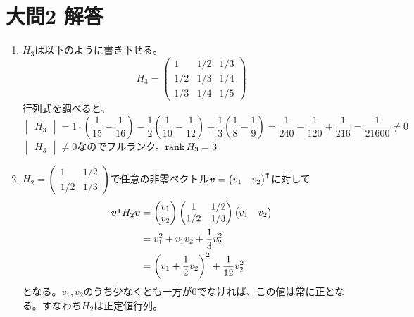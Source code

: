 \documentclass[dvipdfmx]{jsreport}
\begin{document}
\section{大問2 解答}
\begin{souanswer} %
\begin{enumerate}
	\item $H_3$は以下のように書き下せる。
\begin{equation*}
	H_3= 
\begin{pmatrix}
	1& 1/2& 1/3\\
	1/2& 1/3& 1/4\\
	1/3& 1/4& 1/5
\end{pmatrix}
\end{equation*}
	行列式を調べると、
\begin{equation*}
	\begin{vmatrix}H_3\end{vmatrix}= 1\cdot \left(\frac{1}{15}- \frac{1}{16}\right)- \frac{1}{2}\left(\frac{1}{10}- \frac{1}{12}\right)+ \frac{1}{3}\left(\frac{1}{8}- \frac{1}{9}\right)= \frac{1}{240}- \frac{1}{120}+ \frac{1}{216}= \frac{1}{21600}\ne 0
\end{equation*}
	$\begin{vmatrix}H_3\end{vmatrix}\ne 0$なのでフルランク。$\operatorname{rank}{H_3}= 3$
	\item $H_2= \begin{pmatrix}1& 1/2\\ 1/2& 1/3\end{pmatrix}$で任意の非零ベクトル$\bm{v}= {\begin{pmatrix}v_1& v_2\end{pmatrix}}^\intercal$に対して
\begin{align*}
	{\bm{v}}^\intercal H_2\bm{v}
	&= \begin{pmatrix}v_1\\ v_2\end{pmatrix}\begin{pmatrix}1& 1/2\\ 1/2& 1/3\end{pmatrix}\begin{pmatrix}v_1& v_2\end{pmatrix}\\
	&= v_1^2+ v_1v_2+ \frac{1}{3}v_2^2\\
	&= \left(v_1+ \frac{1}{2}v_2\right)^2+ \frac{1}{12}v_2^2
\end{align*}
	となる。$v_1, v_2$のうち少なくとも一方が0でなければ、この値は常に正となる。すなわち$H_2$は正定値行列。

\end{enumerate}
\end{souanswer}
\end{document}
